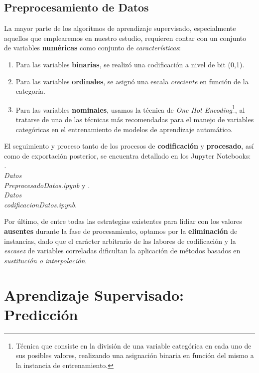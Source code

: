 

 \subsection{Preprocesamiento de Datos}

 La mayor parte de los algoritmos de aprendizaje supervisado, especialmente aquellos que emplearemos en nuestro estudio, requieren contar con un conjunto de variables \textbf{numéricas} como conjunto de \textit{características}:
 
 \begin{enumerate}
     \item Para las variables \textbf{binarias}, se realizó una codificación a nivel de bit (0,1).
     \item Para las variables \textbf{ordinales}, se asignó una escala \textit{creciente} en función de la categoría.
     \item Para las variables \textbf{nominales}, usamos la técnica de \textit{One Hot Encoding}\footnote{Técnica que consiste en la división de una variable categórica en cada uno de sus posibles valores, realizando una asignación binaria en función del mismo a la instancia de entrenamiento.}, al tratarse de una de las técnicas más recomendadas para el manejo de variables categóricas en el entrenamiento de modelos de aprendizaje automático\cite{Potdar2017AClassifiers}.
 \end{enumerate}

 El seguimiento y proceso tanto de los procesos de \textbf{codificación} y \textbf{procesado}, así como de exportación posterior, se encuentra detallado en los Jupyter Notebooks: \textit{.\\Datos\\PreprocesadoDatos.ipynb} y \textit{.\\Datos\\codificacionDatos.ipynb}.

Por último, de entre todas las estrategias\cite{Emmanuel2021ALearning} existentes para lidiar con los valores \textbf{ausentes} durante la fase de procesamiento, optamos por la \textbf{eliminación} de instancias, dado que el carácter arbitrario de las labores de codificación y la \textit{escasez} de variables correladas dificultan la aplicación de métodos basados en \textit{sustitución o interpolación}. 

\newpage

\section{Aprendizaje Supervisado: Predicción}

